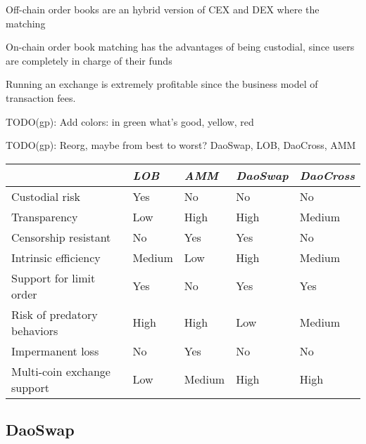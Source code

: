 \documentclass[11pt, reqno]{amsart}
\begin{document}
Off-chain order books are an hybrid version of CEX and DEX where the matching

On-chain order book matching has the advantages of being custodial, since users
are completely in charge of their funds

Running an exchange is extremely profitable since the business model of transaction fees.

TODO(gp): Add colors: in green what's good, yellow, red

TODO(gp): Reorg, maybe from best to worst? DaoSwap, LOB, DaoCross, AMM

\begin{samepage}
	\begin{table}[h!]
		\centering
		\begin{tabular}{lllll}
			                            & \emph{LOB} & \emph{AMM} & \emph{DaoSwap} & \emph{DaoCross} \\
			\hline
			Custodial risk              & Yes        & No         & No             & No              \\
			Transparency                & Low        & High       & High           & Medium          \\
			Censorship resistant        & No         & Yes        & Yes            & No              \\
			Intrinsic efficiency        & Medium     & Low        & High           & Medium          \\
			Support for limit order     & Yes        & No         & Yes            & Yes             \\
			Risk of predatory behaviors & High       & High       & Low            & Medium          \\
			Impermanent loss            & No         & Yes        & No             & No              \\
			Multi-coin exchange support & Low        & Medium     & High           & High            \\
			\hline
		\end{tabular}
	\end{table}
\end{samepage}

\subsection{DaoSwap}
\end{document}
